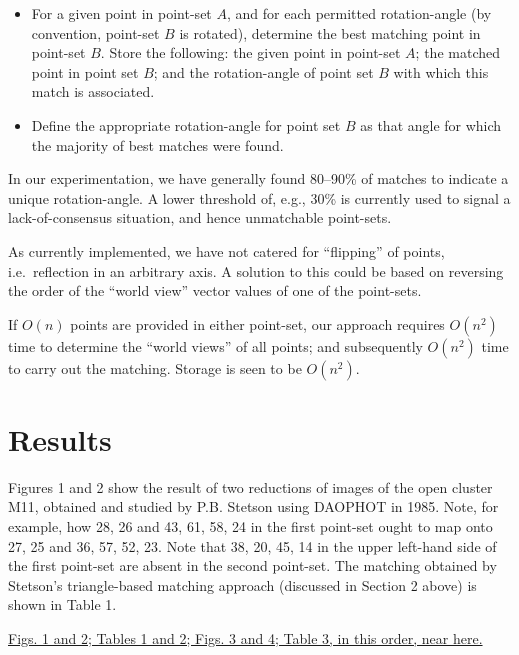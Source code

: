 \begin{itemize}

\item For a given point in point-set $A$, and for 
each permitted rotation-angle (by convention, point-set $B$ is rotated),
determine the best  matching point in point-set $B$.  Store the following:
the given point in
point-set $A$; the matched point in point set $B$; and the rotation-angle
of point set $B$ with which this match is associated.

\item Define the appropriate rotation-angle for point set $B$ as that
angle for which the majority of best matches were found. 

\end{itemize}

In our experimentation, we have generally found 80--90\% of matches to 
indicate a unique rotation-angle.  
A lower threshold of, e.g., 30\% is currently
used to signal a lack-of-consensus situation, and hence unmatchable point-sets.

As currently implemented, we have not catered for ``flipping'' of points,
i.e.\ reflection in an arbitrary axis.  A solution to this could be based
on reversing the order of the ``world view'' vector values of one of the 
point-sets. 

If $O(n)$ points are provided in either point-set, our approach 
requires $O(n^2)$ time to determine the ``world views'' of
all points; and subsequently $O(n^2)$ time to carry out the matching.  
Storage is seen to be $O(n^2)$.  


\section{Results}


Figures 1 and 2 show the result of two reductions of images of the open cluster
M11, obtained and studied by P.B. Stetson using DAOPHOT in 1985.  Note, for
example, how 28, 26 and 43, 61, 58, 24 in the first point-set ought to map 
onto 27, 25 and 36, 57, 52, 23.  Note that 38, 20, 45, 14 in the upper
left-hand side of the first  point-set are absent in the second point-set.
The matching
obtained by Stetson's triangle-based 
matching approach (discussed in Section 2 above) is shown in 
Table 1.

\begin{center}
\bigskip

\underline{Figs. 1 and 2; Tables 1 and 2; Figs. 3 and 4; Table 3, 
in this order,
near here.}

\end{center}


